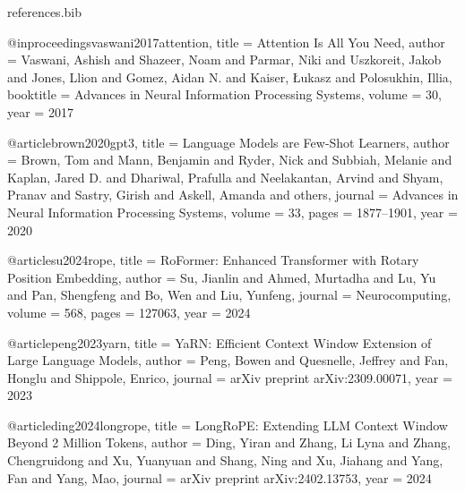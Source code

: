 \begin{filecontents}[overwrite]{references.bib}

@inproceedings{vaswani2017attention,
  title     = {Attention Is All You Need},
  author    = {Vaswani, Ashish and Shazeer, Noam and Parmar, Niki and Uszkoreit, Jakob and
               Jones, Llion and Gomez, Aidan N. and Kaiser, {\L}ukasz and Polosukhin, Illia},
  booktitle = {Advances in Neural Information Processing Systems},
  volume    = {30},
  year      = {2017}
}

@article{brown2020gpt3,
  title   = {Language Models are Few-Shot Learners},
  author  = {Brown, Tom and Mann, Benjamin and Ryder, Nick and Subbiah, Melanie and
             Kaplan, Jared D. and Dhariwal, Prafulla and Neelakantan, Arvind and
             Shyam, Pranav and Sastry, Girish and Askell, Amanda and others},
  journal = {Advances in Neural Information Processing Systems},
  volume  = {33},
  pages   = {1877--1901},
  year    = {2020}
}


@article{su2024rope,
  title   = {{RoFormer}: Enhanced Transformer with Rotary Position Embedding},
  author  = {Su, Jianlin and Ahmed, Murtadha and Lu, Yu and Pan, Shengfeng and
             Bo, Wen and Liu, Yunfeng},
  journal = {Neurocomputing},
  volume  = {568},
  pages   = {127063},
  year    = {2024}
}

@article{peng2023yarn,
  title   = {{YaRN}: Efficient Context Window Extension of Large Language Models},
  author  = {Peng, Bowen and Quesnelle, Jeffrey and Fan, Honglu and Shippole, Enrico},
  journal = {arXiv preprint arXiv:2309.00071},
  year    = {2023}
}

@article{ding2024longrope,
  title   = {{LongRoPE}: Extending {LLM} Context Window Beyond 2 Million Tokens},
  author  = {Ding, Yiran and Zhang, Li Lyna and Zhang, Chengruidong and Xu, Yuanyuan and
             Shang, Ning and Xu, Jiahang and Yang, Fan and Yang, Mao},
  journal = {arXiv preprint arXiv:2402.13753},
  year    = {2024}
}


\end{filecontents}
